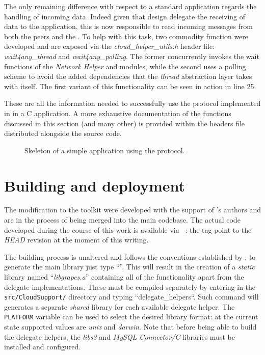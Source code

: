 The only remaining difference with respect to a standard application
regards the handling of incoming
data. Indeed given that \grapes design delegate the receiving of data
to the application, this is now responsible to read incoming messages
from both the peers and the \cloud. To help with this task, two
commodity function were developed and are exposed via the
\textit{cloud\_helper\_utils.h} header file: \textit{wait4any\_thread} and
\textit{wait4any\_polling}. The former concurrently invokes the wait
functions of the \textit{Network Helper} and \cloudhelper modules,
while the second uses a polling scheme to avoid the added dependencies
that the \textit{thread} abstraction layer takes with itself. The
first variant of this functionality can be seen in action in line 25.

These are all the information needed to successfully use the
\cloudcast \peersampling protocol implemented in \grapes in a C
application. A more exhaustive documentation of the functions discussed
in this section (and many other) is provided within the headers file
distributed alongside the source code.

\begin{figure}[H]
  \centering
  
  \caption{Skeleton of a simple application using the \cloudcast
    \peersampling protocol.}
  \label{lst:grapes-example-app}
\end{figure}

\section{Building and deployment}
The modification to the toolkit were developed with the
support of \grapes's authors and are in the process of being merged
into the main codebase. The actual code developed during the course of
this work is available via \github~\cite{GRAPES-repo}: the tag
\thesistag point to the \emph{HEAD} revision at the moment of this
writing.

The building process is unaltered and follows the conventions
established by \grapes: to generate the main library just type ``\make''. This
will result in the creation of a \emph{static} library named
``\textit{libgrapes.a}'' containing all of the functionality apart
from the \cloudhelper delegate implementations. These must be compiled
separately by entering in the \texttt{src/CloudSupport/} directory and
typing ``\make delegate\_helpers``. Such command will generates a
separate \textit{shared} library for each available delegate
helper. The \texttt{PLATFORM} variable can be used to select the
desired library format: at the current state supported values are
\textit{unix} and \textit{darwin}.
Note that before being able to build the delegate helpers, the
\emph{libs3} and \emph{MySQL Connector/C} libraries must be
installed and configured.


